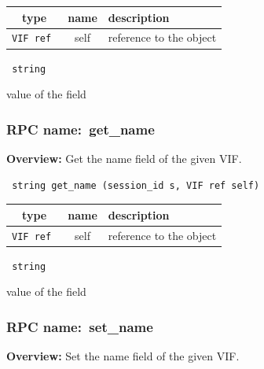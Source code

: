 
 
\vspace{0.3cm}
\begin{tabular}{|c|c|p{7cm}|}
 \hline
{\bf type} & {\bf name} & {\bf description} \\ \hline
{\tt VIF ref } & self & reference to the object \\ \hline 

\end{tabular}

\vspace{0.3cm}

{\tt 
string
}


value of the field
\vspace{0.3cm}
\vspace{0.3cm}
\vspace{0.3cm}
\subsubsection{RPC name:~get\_name}

{\bf Overview:} 
Get the name field of the given VIF.

\begin{verbatim} string get_name (session_id s, VIF ref self)\end{verbatim}



 
\vspace{0.3cm}
\begin{tabular}{|c|c|p{7cm}|}
 \hline
{\bf type} & {\bf name} & {\bf description} \\ \hline
{\tt VIF ref } & self & reference to the object \\ \hline 

\end{tabular}

\vspace{0.3cm}

{\tt 
string
}


value of the field
\vspace{0.3cm}
\vspace{0.3cm}
\vspace{0.3cm}
\subsubsection{RPC name:~set\_name}

{\bf Overview:} 
Set the name field of the given VIF.

